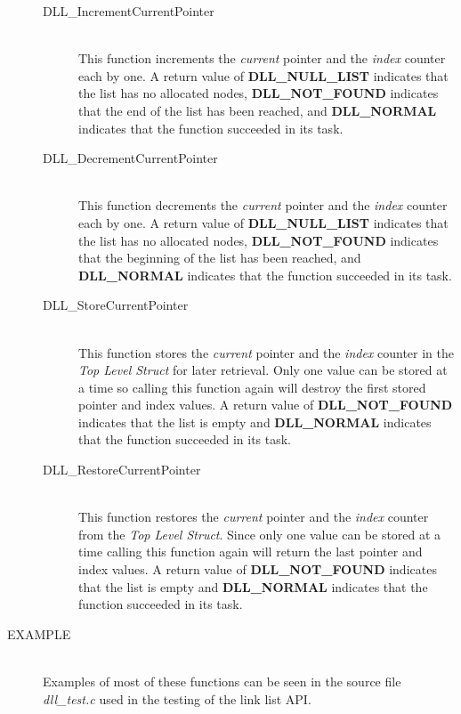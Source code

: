 \documentclass[10pt,letterpaper,titlepage]{article}
\begin{document}
\begin{description}
\begin{description}
 \item[DLL\_IncrementCurrentPointer]\quad\\
 This function increments the \emph{current} pointer and the \emph{index} counter each by one.  A return value of \textbf{DLL\_NULL\_LIST} indicates that the list has no allocated nodes, \textbf{DLL\_NOT\_FOUND} indicates that the end of the list has been reached, and \textbf{DLL\_NORMAL} indicates that the function succeeded in its task.

 \item[DLL\_DecrementCurrentPointer]\quad\\
 This function decrements the \emph{current} pointer and the \emph{index} counter each by one.  A return value of \textbf{DLL\_NULL\_LIST} indicates that the list has no allocated nodes, \textbf{DLL\_NOT\_FOUND} indicates that the beginning of the list has been reached, and \textbf{DLL\_NORMAL} indicates that the function succeeded in its task.

 \item[DLL\_StoreCurrentPointer]\quad\\
 This function stores the \emph{current} pointer and the \emph{index} counter in the \emph{Top Level Struct} for later retrieval.  Only one value can be stored at a time so calling this function again will destroy the first stored pointer and index values.  A return value of \textbf{DLL\_NOT\_FOUND} indicates that the list is empty and \textbf{DLL\_NORMAL} indicates that the function succeeded in its task.

 \item[DLL\_RestoreCurrentPointer]\quad\\
 This function restores the \emph{current} pointer and the \emph{index} counter from the \emph{Top Level Struct}.  Since only one value can be stored at a time calling this function again will return the last pointer and index values.  A return value of \textbf{DLL\_NOT\_FOUND} indicates that the list is empty and \textbf{DLL\_NORMAL} indicates that the function succeeded in its task.
 \end{description}

\item[EXAMPLE]\quad\\
Examples of most of these functions can be seen in the source file \emph{dll\_test.c} used in the testing of the link list API.

\end{description}
\pagebreak
\end{document}
